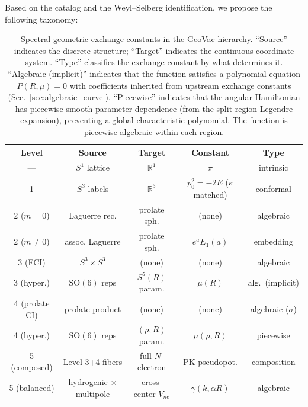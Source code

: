 \documentclass[aps,pra,twocolumn,superscriptaddress,longbibliography]{revtex4-2}
\begin{document}
Based on the catalog and the Weyl--Selberg identification, we
propose the following taxonomy:

\begin{table}[h]
\caption{Spectral-geometric exchange constants in the GeoVac
  hierarchy.  ``Source'' indicates the discrete structure;
  ``Target'' indicates the continuous coordinate system.
  ``Type'' classifies the exchange constant by what determines it.
  ``Algebraic (implicit)'' indicates that the function satisfies a
  polynomial equation $P(R,\mu) = 0$ with coefficients inherited from
  upstream exchange constants (Sec.~\ref{sec:algebraic_curve}).
  ``Piecewise'' indicates that the angular Hamiltonian has
  piecewise-smooth parameter dependence (from the split-region
  Legendre expansion), preventing a global characteristic polynomial.
  The function is piecewise-algebraic within each region.}
\label{tab:taxonomy}
\begin{ruledtabular}
\begin{tabular}{ccccc}
  Level & Source & Target & Constant & Type \\
  \hline
  --- & $S^1$ lattice & $\mathbb{R}^1$ & $\pi$ & intrinsic \\
  1 & $S^3$ labels & $\mathbb{R}^3$ & $p_0^2{=}{-}2E$ ($\kappa$ matched) & conformal \\
  2 ($m{=}0$) & Laguerre rec. & prolate sph. & (none) & algebraic \\
  2 ($m{\neq}0$) & assoc. Laguerre & prolate sph. & $e^a E_1(a)$
    & embedding \\
  3 (FCI) & $S^3 {\times} S^3$ & (none) & (none) & algebraic \\
  3 (hyper.) & $\mathrm{SO}(6)$ reps & $S^5(R)$ param.
    & $\mu(R)$ & alg.\ (implicit) \\
  4 (prolate CI) & prolate product & (none) & (none) & algebraic ($\sigma$) \\
  4 (hyper.) & $\mathrm{SO}(6)$ reps & $(\rho,R)$ param.
    & $\mu(\rho,R)$ & piecewise \\
  5 (composed) & Level 3+4 fibers & full $N$-electron
    & PK pseudopot. & composition \\
  5 (balanced) & hydrogenic $\times$ multipole & cross-center $V_{ne}$
    & $\gamma(k,\alpha R)$ & algebraic \\
\end{tabular}
\end{ruledtabular}
\end{table}
\end{document}
